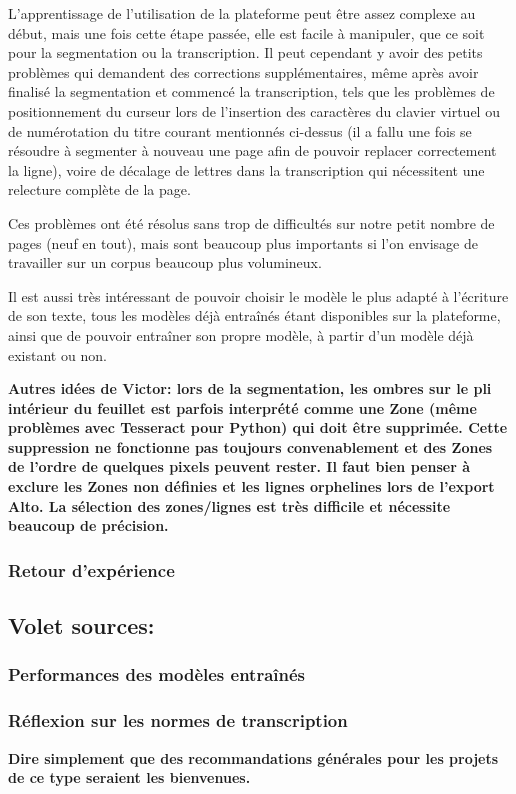 \documentclass{article}
\begin{document}
	L’apprentissage de l’utilisation de la plateforme peut être assez complexe au début, mais une fois cette étape passée, elle est facile à manipuler, que ce soit pour la segmentation ou la transcription. Il peut cependant y avoir des petits problèmes qui demandent des corrections supplémentaires, même après avoir finalisé la segmentation et commencé la transcription, tels que les problèmes de positionnement du curseur lors de l’insertion des caractères du clavier virtuel ou de numérotation du titre courant mentionnés ci-dessus (il a fallu une fois se résoudre à segmenter à nouveau une page afin de pouvoir replacer correctement la ligne), voire de décalage de lettres dans la transcription qui nécessitent une relecture complète de la page. 
	
	Ces problèmes ont été résolus sans trop de difficultés sur notre petit nombre de pages (neuf en tout), mais sont beaucoup plus importants si l’on envisage de travailler sur un corpus beaucoup plus volumineux.
	
	Il est aussi très intéressant de pouvoir choisir le modèle le plus adapté à l’écriture de son texte, tous les modèles déjà entraînés étant disponibles sur la plateforme, ainsi que de pouvoir entraîner son propre modèle, à partir d’un modèle déjà existant ou non.
	
	\textbf{Autres idées de Victor: lors de la segmentation, les ombres sur le pli intérieur du feuillet est parfois interprété comme une Zone (même problèmes avec Tesseract pour Python) qui doit être supprimée. Cette suppression ne fonctionne pas toujours convenablement et des Zones de l'ordre de quelques pixels peuvent rester. Il faut bien penser à exclure les Zones non définies et les lignes orphelines lors de l'export Alto. La sélection des zones/lignes est très difficile et nécessite beaucoup de précision.}
	
	
	\subsubsection{Retour d'expérience}
	\subsection{Volet sources:}
	\subsubsection{Performances des modèles entraînés}
	\subsubsection{Réflexion sur les normes de transcription}
	\textbf{Dire simplement que des recommandations générales pour les projets de ce type seraient les bienvenues.}
	
	\printglossaries
	
	\printbibheading
	
	\printbibliography[heading=subbibliography,title=Projets et ressources,keyword=projets]
	
	\printbibliography[heading=subbibliography,title=Notices,keyword=notices]
	
	\printbibliography[heading=subbibliography,title=Études,keyword=autres]
	
\end{document}
